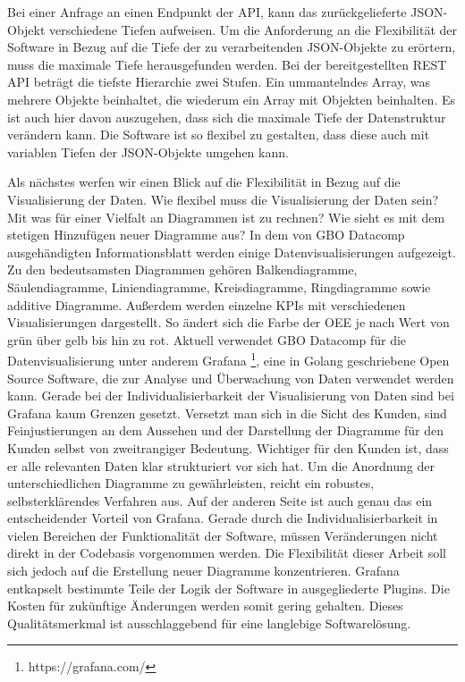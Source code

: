 Bei einer Anfrage an einen Endpunkt der API, kann das zurückgelieferte JSON-Objekt verschiedene Tiefen aufweisen. 
Um die Anforderung an die Flexibilität der Software in Bezug auf die Tiefe der zu verarbeitenden JSON-Objekte zu
erörtern, muss die maximale Tiefe herausgefunden werden. Bei der bereitgestellten REST API beträgt die tiefste
Hierarchie zwei Stufen. Ein ummantelndes Array, was mehrere Objekte beinhaltet, die wiederum ein Array mit Objekten
beinhalten. Es ist auch hier davon auszugehen, dass sich die maximale Tiefe der Datenstruktur verändern kann.
Die Software ist so flexibel zu gestalten, dass diese auch mit variablen Tiefen der JSON-Objekte umgehen kann.

Als nächstes werfen wir einen Blick auf die Flexibilität in Bezug auf die Visualisierung der Daten. Wie flexibel
muss die Visualisierung der Daten sein? Mit was für einer Vielfalt an Diagrammen ist zu rechnen? Wie sieht es
mit dem stetigen Hinzufügen neuer Diagramme aus? In dem von GBO Datacomp ausgehändigten Informationsblatt
werden einige Datenvisualisierungen aufgezeigt. Zu den bedeutsamsten Diagrammen gehören Balkendiagramme,
Säulendiagramme, Liniendiagramme, Kreisdiagramme, Ringdiagramme sowie additive Diagramme. Außerdem werden
einzelne KPIs mit verschiedenen Visualisierungen dargestellt. So ändert sich die Farbe der OEE je nach
Wert von grün über gelb bis hin zu rot. Aktuell verwendet GBO Datacomp für die Datenvisualisierung unter
anderem Grafana \footnote{https://grafana.com/}, eine in Golang geschriebene Open Source Software, die zur Analyse
und Überwachung von Daten verwendet werden kann. Gerade bei der Individualisierbarkeit der Visualisierung
von Daten sind bei Grafana kaum Grenzen gesetzt. Versetzt man sich in die Sicht des Kunden, sind \mbox{Feinjustierungen}
an dem Aussehen und der Darstellung der Diagramme für den Kunden selbst von zweitrangiger Bedeutung.
Wichtiger für den Kunden ist, dass er alle relevanten Daten klar strukturiert vor sich hat. Um die Anordnung
der unterschiedlichen Diagramme zu gewährleisten, reicht ein robustes, selbsterklärendes Verfahren aus.
Auf der anderen Seite ist auch genau das ein entscheidender Vorteil von Grafana. Gerade durch die
Individualisierbarkeit in vielen Bereichen der Funktionalität der Software, müssen Veränderungen nicht
direkt in der Codebasis vorgenommen werden. Die Flexibilität dieser Arbeit soll sich jedoch auf die
Erstellung neuer Diagramme konzentrieren. Grafana entkapselt bestimmte Teile der Logik der Software
in ausgegliederte Plugins.\cite{GrafanaDeveloperGuide} Die Kosten für zukünftige Änderungen werden
somit gering gehalten. Dieses Qualitätsmerkmal ist ausschlaggebend für eine langlebige Softwarelösung.

